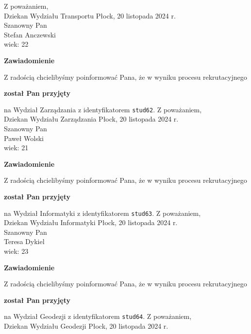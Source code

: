 \documentclass[12pt,a4paper]{article}
\begin{document}
\vspace{2cm}
\noindent
Z poważaniem,\\
Dziekan
Wydziału Transportu
\newpage
\hfill Płock, 20 listopada 2024 r.\\
\noindent 
Szanowny Pan \\
Stefan Anczewski \\
wiek: 22
\bigskip
\begin{center}
 	{\Large\textbf{Zawiadomienie}}
\end{center}
\bigskip
Z radością chcielibyśmy poinformować Pana, że w wyniku procesu rekrutacyjnego 
\begin{center}
\textsf{\textbf{został Pan przyjęty}} 
\end{center}
na Wydział Zarządzania z identyfikatorem \verb|stud62|. 
\vspace{2cm}
\noindent
Z poważaniem,\\
Dziekan
Wydziału Zarządzania
\newpage
\hfill Płock, 20 listopada 2024 r.\\
\noindent 
Szanowny Pan \\
Paweł Wolski \\
wiek: 21
\bigskip
\begin{center}
 	{\Large\textbf{Zawiadomienie}}
\end{center}
\bigskip
Z radością chcielibyśmy poinformować Pana, że w wyniku procesu rekrutacyjnego 
\begin{center}
\textsf{\textbf{został Pan przyjęty}} 
\end{center}
na Wydział Informatyki z identyfikatorem \verb|stud63|. 
\vspace{2cm}
\noindent
Z poważaniem,\\
Dziekan
Wydziału Informatyki
\newpage
\hfill Płock, 20 listopada 2024 r.\\
\noindent 
Szanowny Pan \\
Teresa Dykiel \\
wiek: 23
\bigskip
\begin{center}
 	{\Large\textbf{Zawiadomienie}}
\end{center}
\bigskip
Z radością chcielibyśmy poinformować Pana, że w wyniku procesu rekrutacyjnego 
\begin{center}
\textsf{\textbf{został Pan przyjęty}} 
\end{center}
na Wydział Geodezji z identyfikatorem \verb|stud64|. 
\vspace{2cm}
\noindent
Z poważaniem,\\
Dziekan
Wydziału Geodezji
\newpage
\hfill Płock, 20 listopada 2024 r.\\
\end{document}
